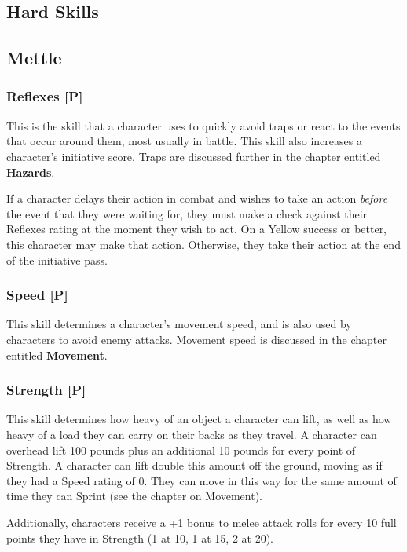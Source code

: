 \documentclass[oneside]{book}
\begin{document}
\begin{multicols}{2}

\section{Hard Skills}
\subsection{Mettle}
\subsubsection{Reflexes [P]}
This is the skill that a character uses to quickly avoid traps or react to the events that occur around them, most usually in battle. This skill also increases a character's initiative score. Traps are discussed further in the chapter entitled \textbf{Hazards}.

If a character delays their action in combat and wishes to take an action \emph{before} the event that they were waiting for, they must make a check against their Reflexes rating at the moment they wish to act. On a Yellow success or better, this character may make that action. Otherwise, they take their action at the end of the initiative pass.

\subsubsection{Speed [P]}
This skill determines a character's movement speed, and is also used by characters to avoid enemy attacks. Movement speed is discussed in the chapter entitled \textbf{Movement}.

\subsubsection{Strength [P]}
This skill determines how heavy of an object a character can lift, as well as how heavy of a load they can carry on their backs as they travel. A character can overhead lift 100 pounds plus an additional 10 pounds for every point of Strength. A character can lift double this amount off the ground, moving as if they had a Speed rating of 0. They can move in this way for the same amount of time they can Sprint (see the chapter on Movement).

Additionally, characters receive a +1 bonus to melee attack rolls for every 10 full points they have in Strength (1 at 10, 1 at 15, 2 at 20).


\end{multicols}
\end{document}
